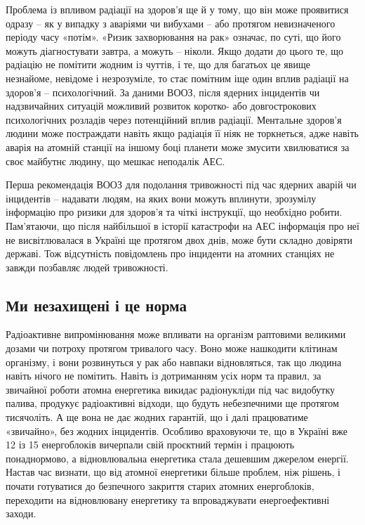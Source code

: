 \documentclass{article}
\begin{document}
Проблема із впливом радіації на здоров’я ще й у тому, що він може проявитися одразу – як у випадку з аваріями чи вибухами – або протягом невизначеного періоду часу «потім». «Ризик захворювання на рак» означає, по суті, що його можуть діагностувати завтра, а можуть – ніколи. Якщо додати до цього те, що радіацію не помітити жодним із чуттів, і те, що для багатьох це явище незнайоме, невідоме і незрозуміле, то стає помітним іще один вплив радіації на здоров’я – психологічний. За даними ВООЗ, після ядерних інцидентів чи надзвичайних ситуацій можливий розвиток коротко- або довгострокових психологічних розладів через потенційний вплив радіації. Ментальне здоров’я людини може постраждати навіть якщо радіація її ніяк не торкнеться, адже навіть аварія на атомній станції на іншому боці планети може змусити хвилюватися за своє майбутнє людину, що мешкає неподалік АЕС.

Перша рекомендація ВООЗ для подолання тривожності під час ядерних аварій чи інцидентів – надавати людям, на яких вони можуть вплинути, зрозумілу інформацію про ризики для здоров’я та чіткі інструкції, що необхідно робити. Пам’ятаючи, що після найбільшої в історії катастрофи на АЕС інформація про неї не висвітлювалася в Україні ще протягом двох днів, може бути складно довіряти державі. Тож відсутність повідомлень про інциденти на атомних станціях не завжди позбавляє людей тривожності.

\subsection{Ми незахищені і це норма}

Радіоактивне випромінювання може впливати на організм раптовими великими дозами чи потроху протягом тривалого часу. Воно може нашкодити клітинам організму, і вони розвинуться у рак або навпаки відновляться, так що людина навіть нічого не помітить.
Навіть із дотриманням усіх норм та правил, за звичайної роботи атомна енергетика викидає радіонукліди під час видобутку палива, продукує радіоактивні відходи, що будуть небезпечними ще протягом тисячоліть. А ще вона не дає жодних гарантій, що і далі працюватиме «звичайно», без жодних інцидентів. Особливо враховуючи те, що в Україні вже 12 із 15 енергоблоків вичерпали свій проєктний термін і працюють понаднормово, а відновлювальна енергетика стала дешевшим джерелом енергії. Настав час визнати, що від атомної енергетики більше проблем, ніж рішень, і почати готуватися до безпечного закриття старих атомних енергоблоків, переходити на відновлювану енергетику та впроваджувати енергоефективні заходи.
\end{document}
